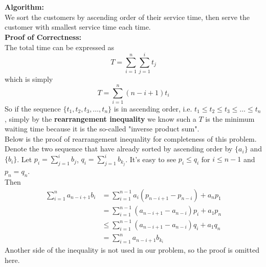 \documentclass[12pt,letterpaper]{article}
\begin{document}
\section{}
\textbf{Algorithm:}\\
We sort the customers by ascending order of their service time,
then serve the customer with smallest service time each time.\\
\textbf{Proof of Correctness:}\\
The total time can be expressed as 
$$T=\sum_{i=1}^{n}\sum_{j=1}^{i}t_j$$
which is simply
$$T=\sum_{i=1}^{n}(n-i+1)t_i$$
So if the sequence $\{t_1,t_2,t_3,\dots,t_n\}$ is in ascending order, i.e.
$t_1\leq t_2\leq t_3\leq\dots\leq t_n$,
simply by the \textbf{rearrangement inequality} we know such a $T$ is the minimum waiting time
because it is the so-called "inverse product sum".\\
\newline
Below is the proof of rearrangement inequality for completeness of this problem.\\
Denote the two sequence that have already sorted by ascending order by $\{a_i\}$ and $\{b_i\}$.
Let $p_i=\sum_{j=1}^{i}b_j$, $q_i=\sum_{j=1}^{i}b_{k_j}$. It's easy to see $p_i\leq q_i$ for $i\leq n-1$ and $p_n=q_n$.\\
Then 
\begin{align}
    \sum_{i=1}^{n}a_{n-i+1}b_{i}&=\sum_{i=1}^{n-1}a_{i}(p_{n-i+1}-p_{n-i})+a_np_1\\
    &=\sum_{i=1}^{n-1}(a_{n-i+1}-a_{n-i})p_i+a_1p_n\\
    &\leq \sum_{i=1}^{n-1}(a_{n-i+1}-a_{n-i})q_i+a_1q_n\\
    &=\sum_{i=1}^{n}a_{n-i+1}b_{k_i}
\end{align}
Another side of the inequality is not used in our problem, 
so the proof is omitted here.

\newpage
\section{}

\newpage
\section{}
\end{document}

